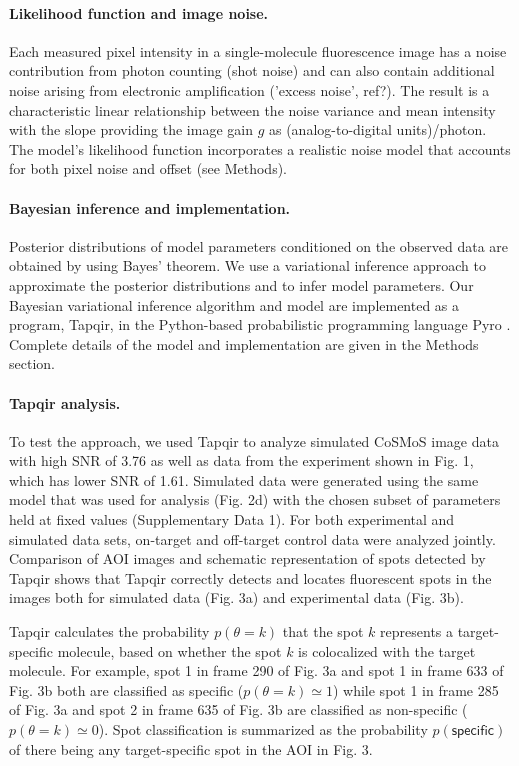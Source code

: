 \paragraph{Likelihood function and image noise.}
Each measured pixel intensity in a single-molecule fluorescence image has a noise contribution from photon counting (shot noise) and can also contain additional noise arising from electronic amplification ('excess noise', ref?). The result is  a characteristic linear relationship between the noise variance and  mean intensity with the slope providing the image gain $g$ as (analog-to-digital units)/photon. The model's likelihood function incorporates a realistic noise model that accounts for both pixel noise and offset (see Methods). 

\paragraph{Bayesian inference and implementation.}
Posterior distributions of model parameters conditioned on the observed data are obtained by using Bayes' theorem. We use a variational inference approach to approximate the posterior distributions and to infer model parameters. Our Bayesian variational inference algorithm and model are implemented as a program, Tapqir, in the Python-based probabilistic programming language Pyro \cite{Bingham2019-qy}. Complete details of the model and implementation are given in the Methods section.

\paragraph{Tapqir analysis.} %
To test the approach, we used Tapqir to analyze simulated CoSMoS image data with high SNR of 3.76 as well as data from the experiment shown in Fig. 1, which has lower SNR of 1.61. Simulated data were generated using the same model that was used for analysis (Fig. 2d) with the chosen subset of parameters held at fixed values (Supplementary Data 1). For both experimental and simulated data sets, on-target and off-target control data were analyzed jointly. Comparison of AOI images and schematic representation of spots detected by Tapqir shows that Tapqir correctly detects and locates fluorescent spots in the images both for simulated data (Fig. 3a) and experimental data (Fig. 3b).

Tapqir calculates the probability $p(\theta=k)$ that the spot $k$ represents a target-specific molecule, based on whether the spot $k$ is colocalized with the target molecule.  For example, spot 1 in frame 290 of Fig. 3a and spot 1 in frame 633 of Fig. 3b both are classified as specific ($p(\theta=k) \simeq 1$) while spot 1 in frame 285 of Fig. 3a and spot 2 in frame 635 of Fig. 3b are classified as non-specific ($p(\theta=k) \simeq 0$). Spot classification is summarized as the probability  $p(\mathsf{specific})$ of there being any target-specific spot in the AOI in Fig. 3. 


